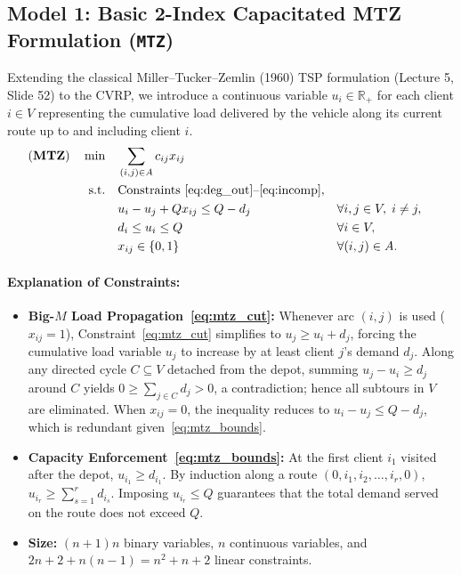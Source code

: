 \documentclass[11pt,a4paper]{article}
\begin{document}
\subsection{Model 1: Basic 2-Index Capacitated MTZ Formulation (\texttt{MTZ})}
Extending the classical Miller--Tucker--Zemlin (1960) TSP formulation (Lecture 5, Slide 52) to the CVRP, we introduce a continuous variable $u_i \in \mathbb{R}_+$ for each client $i \in V$ representing the cumulative load delivered by the vehicle along its current route up to and including client $i$.
\begin{align}
\text{(\textbf{MTZ})} \quad \min \quad & \sum_{(i,j) \in A} c_{ij} x_{ij} \nonumber \\
\text{s.t.} \quad & \text{Constraints~\eqref{eq:deg_out}--\eqref{eq:incomp}}, \nonumber \\
& u_i - u_j + Q x_{ij} \le Q - d_j && \forall i, j \in V, \; i \neq j, \label{eq:mtz_cut} \\
& d_i \le u_i \le Q && \forall i \in V, \label{eq:mtz_bounds} \\
& x_{ij} \in \{0, 1\} && \forall (i, j) \in A. \nonumber
\end{align}
\paragraph{Explanation of Constraints:}
\begin{itemize}[noitemsep,topsep=2pt]
    \item \textbf{Big-$M$ Load Propagation~\eqref{eq:mtz_cut}:} Whenever arc $(i, j)$ is used ($x_{ij} = 1$), Constraint~\eqref{eq:mtz_cut} simplifies to $u_j \ge u_i + d_j$, forcing the cumulative load variable $u_j$ to increase by at least client $j$'s demand $d_j$. Along any directed cycle $C \subseteq V$ detached from the depot, summing $u_j - u_i \ge d_j$ around $C$ yields $0 \ge \sum_{j \in C} d_j > 0$, a contradiction; hence all subtours in $V$ are eliminated. When $x_{ij} = 0$, the inequality reduces to $u_i - u_j \le Q - d_j$, which is redundant given~\eqref{eq:mtz_bounds}.
    \item \textbf{Capacity Enforcement~\eqref{eq:mtz_bounds}:} At the first client $i_1$ visited after the depot, $u_{i_1} \ge d_{i_1}$. By induction along a route $(0, i_1, i_2, \dots, i_r, 0)$, $u_{i_r} \ge \sum_{s=1}^r d_{i_s}$. Imposing $u_{i_r} \le Q$ guarantees that the total demand served on the route does not exceed $Q$.
    \item \textbf{Size:} $(n+1)n$ binary variables, $n$ continuous variables, and $2n + 2 + n(n-1) = n^2 + n + 2$ linear constraints.
\end{itemize}
\end{document}
